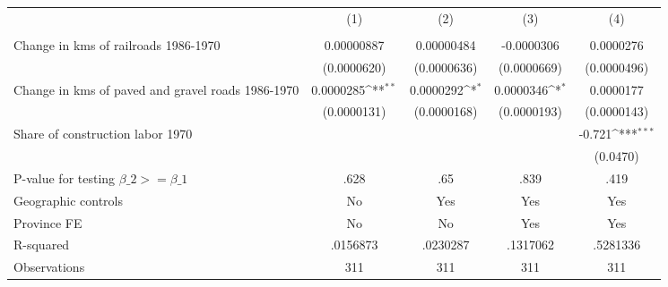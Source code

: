 {
\def\sym#1{\ifmmode^{#1}\else\(^{#1}\)\fi}
\begin{tabular}{l*{4}{c}}
\hline\hline
                &\multicolumn{1}{c}{(1)}&\multicolumn{1}{c}{(2)}&\multicolumn{1}{c}{(3)}&\multicolumn{1}{c}{(4)}\\
                &\multicolumn{1}{c}{}&\multicolumn{1}{c}{}&\multicolumn{1}{c}{}&\multicolumn{1}{c}{}\\
\hline
Change in kms of railroads 1986-1970&0.00000887         &0.00000484         &-0.0000306         &0.0000276         \\
                &(0.0000620)         &(0.0000636)         &(0.0000669)         &(0.0000496)         \\
[1em]
Change in kms of paved and gravel roads 1986-1970&0.0000285\sym{**} &0.0000292\sym{*}  &0.0000346\sym{*}  &0.0000177         \\
                &(0.0000131)         &(0.0000168)         &(0.0000193)         &(0.0000143)         \\
[1em]
Share of construction labor 1970&                  &                  &                  &   -0.721\sym{***}\\
                &                  &                  &                  & (0.0470)         \\
\hline
P-value for testing $\beta\_{2} >= \beta\_{1}$&     .628         &      .65         &     .839         &     .419         \\
Geographic controls&       No         &      Yes         &      Yes         &      Yes         \\
Province FE     &       No         &       No         &      Yes         &      Yes         \\
R-squared       & .0156873         & .0230287         & .1317062         & .5281336         \\
Observations    &      311         &      311         &      311         &      311         \\
\hline\hline
\end{tabular}
}
